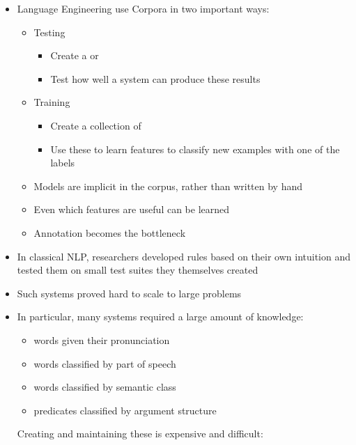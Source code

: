 \documentclass[a4paper,landscape,headrule,footrule,dvips]{foils}
\begin{document}
\begin{CJK}{UTF8}{min}

\begin{itemize}
\item Language Engineering use Corpora in two important ways:
  \begin{itemize}
  \item Testing
    \begin{itemize}
    \item Create a  or 
    \item Test how well a system can produce these results
    \end{itemize}
  \item Training
   \begin{itemize}
    \item Create a collection of 
    \item Use these to learn features to classify new examples with
      one of the labels
    \end{itemize}

  \item Models are implicit in the corpus, rather than written by hand
  \item Even which features are useful can be learned
  \item Annotation becomes the bottleneck
  \end{itemize}
\end{itemize}


\begin{itemize}
\item In classical NLP, researchers developed rules based on their own
  intuition and tested them on small test suites they themselves created
\item Such systems proved hard to scale to large problems
\item In particular, many systems required a large amount of knowledge:
  \begin{itemize}
  \item words given their pronunciation
  \item words classified by part of speech
  \item words classified by semantic class
  \item predicates classified by argument structure
  \end{itemize}
Creating and maintaining these is expensive and difficult:
\\ 
\end{itemize}


\end{CJK}
\end{document}
